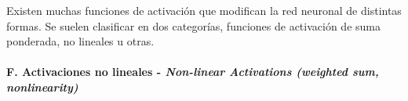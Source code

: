 Existen muchas funciones de activación que modifican la red neuronal de distintas formas.
Se suelen clasificar en dos categorías, funciones de activación de suma ponderada, no lineales u otras.


\paragraph*{F. Activaciones no lineales - \textit{Non-linear Activations (weighted sum, nonlinearity)} \cite{pytorch2024github}}




